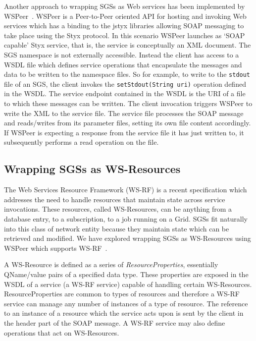 \documentclass{llncs}
\begin{document}
Another approach to wrapping SGSs as Web services has been implemented by WSPeer~\cite{wspeer}. WSPeer is a Peer-to-Peer oriented API for hosting and invoking Web services which has a binding to the jstyx libraries allowing SOAP messaging to take place using the Styx protocol. In this scenario WSPeer launches as `SOAP capable' Styx service, that is, the service is conceptually an XML document. The SGS namespace is not externally accessible. Instead the client has access to a WSDL file which defines service operations that encapsulate the messages and data to be written to the namespace files. So for example, to write to the \texttt{stdout} file of an SGS, the client invokes the \texttt{setStdout(String uri)} operation defined in the WSDL. The service endpoint contained in the WSDL is the URI of a file to which these messages can be written. The client invocation triggers WSPeer to write the XML to the service file. The service file processes the SOAP message and reads/writes from its parameter files, setting its own file content accordingly. If WSPeer is expecting a response from the service file it has just written to, it subsequently performs a read operation on the file.

\subsection{Wrapping SGSs as WS-Resources}
\label{subsec:ws-resources}

The Web Services Resource Framework (WS-RF) is a recent specification which addresses the need to handle resources that maintain state across service invocations. These resources, called WS-Resources, can be anything from a database entry, to a subscription, to a job running on a Grid. SGSs fit naturally into this class of network entity because they maintain state which can be retrieved and modified. We have explored wrapping SGSs as WS-Resources using WSPeer which supports WS-RF~\cite{wsrf}.

\sloppypar A WS-Resource is defined as a series of \emph{ResourceProperties}, essentially QName/value pairs of a specified data type. These properties are exposed in the WSDL of a service (a WS-RF service) capable of handling certain WS-Resources. ResourceProperties are common to types of resources and therefore a WS-RF service can manage any number of instances of a type of resource. The reference to an instance of a resource which the service acts upon is sent by the client in the header part of the SOAP message. A WS-RF service may also define operations that act on WS-Resources.
\end{document}
